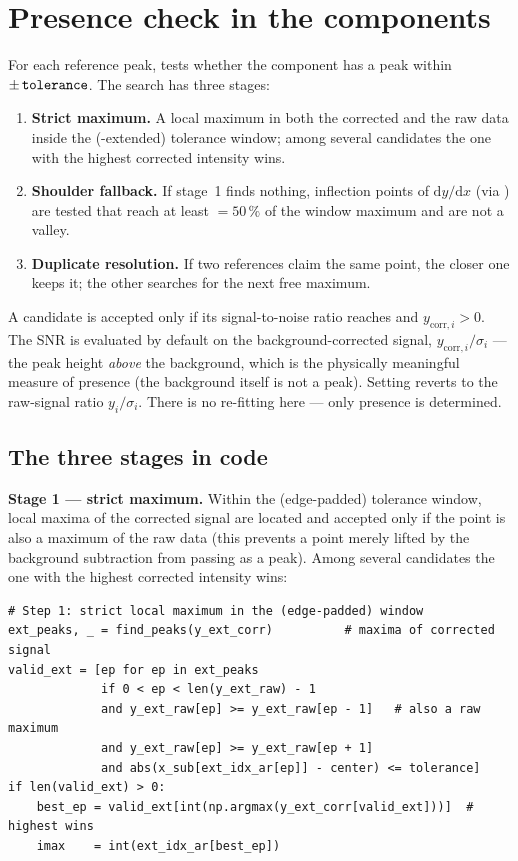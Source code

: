 \documentclass[11pt,a4paper]{article}
\begin{document}
\section{Presence check in the components}
For each reference peak,  tests whether the
component has a peak within $\pm\,\code{tolerance}$. The search has three stages:
\begin{enumerate}
\item \textbf{Strict maximum.} A local maximum in both the corrected and the raw
data inside the (-extended) tolerance window; among several
candidates the one with the highest corrected intensity wins.
\item \textbf{Shoulder fallback.} If stage~1 finds nothing, inflection points of
$\mathrm{d}y/\mathrm{d}x$ (via ) are tested that reach at least
${}=50\,\%$ of the window maximum and are not a valley.
\item \textbf{Duplicate resolution.} If two references claim the same point, the
closer one keeps it; the other searches for the next free maximum.
\end{enumerate}
A candidate is accepted only if its signal-to-noise ratio reaches
 and $y_{\text{corr},i} > 0$. The SNR is evaluated by default on
the background-corrected signal, $y_{\text{corr},i}/\sigma_i$ --- the peak height
\emph{above} the background, which is the physically meaningful measure of
presence (the background itself is not a peak). Setting
 reverts to the raw-signal ratio
$y_i/\sigma_i$. There is no re-fitting here --- only presence is determined.

\subsection{The three stages in code}
\textbf{Stage 1 --- strict maximum.} Within the (edge-padded) tolerance window,
local maxima of the corrected signal are located and accepted only if the point
is also a maximum of the raw data (this prevents a point merely lifted by the
background subtraction from passing as a peak). Among several candidates the one
with the highest corrected intensity wins:

\begin{lstlisting}[style=py]
# Step 1: strict local maximum in the (edge-padded) window
ext_peaks, _ = find_peaks(y_ext_corr)          # maxima of corrected signal
valid_ext = [ep for ep in ext_peaks
             if 0 < ep < len(y_ext_raw) - 1
             and y_ext_raw[ep] >= y_ext_raw[ep - 1]   # also a raw maximum
             and y_ext_raw[ep] >= y_ext_raw[ep + 1]
             and abs(x_sub[ext_idx_ar[ep]] - center) <= tolerance]
if len(valid_ext) > 0:
    best_ep = valid_ext[int(np.argmax(y_ext_corr[valid_ext]))]  # highest wins
    imax    = int(ext_idx_ar[best_ep])
\end{lstlisting}
\end{document}
